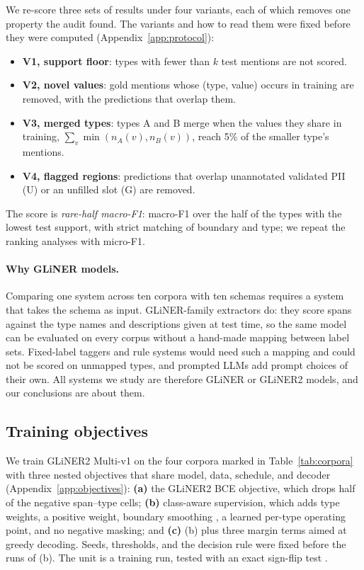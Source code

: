 \documentclass[11pt]{article}
\begin{document}
We re-score three sets of results under four variants, each of which
removes one property the audit found. The variants and how to read them
were fixed before they were computed (Appendix~\ref{app:protocol}):
\begin{itemize}
\item \textbf{V1, support floor}: types with fewer than $k$ test mentions
are not scored.
\item \textbf{V2, novel values}: gold mentions whose (type, value) occurs
in training are removed, with the predictions that overlap them.
\item \textbf{V3, merged types}: types A and B merge when the values they
share in training, $\sum_v \min(n_A(v), n_B(v))$, reach 5\% of the
smaller type's mentions.
\item \textbf{V4, flagged regions}: predictions that overlap unannotated
validated PII (U) or an unfilled slot (G) are removed.
\end{itemize}
The score is \emph{rare-half macro-F1}: macro-F1 over the half of the
types with the lowest test support, with strict matching of boundary and
type; we repeat the ranking analyses with micro-F1.

\paragraph{Why GLiNER models.}
Comparing one system across ten corpora with ten schemas requires a
system that takes the schema as input. GLiNER-family extractors
\cite{zaratiana-etal-2024-gliner,zaratiana2025gliner2efficientmultitaskinformation} do: they score
spans against the type names and descriptions given at test time, so the
same model can be evaluated on every corpus without a hand-made mapping
between label sets. Fixed-label taggers and rule systems would need
such a mapping and could not be scored on unmapped types, and prompted
LLMs add prompt choices of their own. All systems we study are
therefore GLiNER or GLiNER2 models, and our conclusions are about them.

\subsection{Training objectives}
\label{sec:case}

We train GLiNER2 Multi-v1 on the four corpora marked in
Table~\ref{tab:corpora} with three nested objectives that share model,
data, schedule, and decoder (Appendix~\ref{app:objectives}):
\textbf{(a)} the GLiNER2 BCE objective, which drops half of the negative
span--type cells; \textbf{(b)} class-aware supervision, which adds type
weights, a positive weight, boundary smoothing
\cite{zhu-li-2022-boundary}, a learned per-type operating point, and no
negative masking; and \textbf{(c)} (b) plus three margin terms aimed at
greedy decoding. Seeds, thresholds, and the decision rule were fixed
before the runs of (b). The unit is a training run, tested with an exact
sign-flip test \cite{dror-etal-2018-hitchhikers}.
\end{document}
